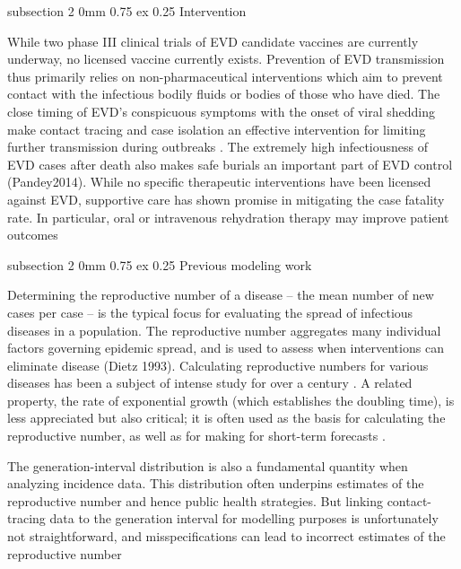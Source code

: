 \documentclass[12pt]{article}
\makeatletter
\renewcommand{\subsection}%
{\vspace{0.0ex \@plus 3.0ex \@minus 1.0ex}\@startsection  %
{subsection}%
{2}%
{0mm}%
{0.75\baselineskip \@plus 0.25 ex}%
{0.25\baselineskip}%
{\normalfont\large\bfseries}}%
\makeatother
\begin{document}
\subsection{Intervention}

While two phase III clinical trials of EVD candidate vaccines are currently underway, no licensed vaccine currently exists. Prevention of EVD transmission thus primarily relies on non-pharmaceutical interventions which aim to prevent contact with the infectious bodily fluids or bodies of those who have died. The close timing of EVD’s conspicuous symptoms with the onset of viral shedding make contact tracing and case isolation an effective intervention for limiting further transmission during outbreaks \cite{YamiGert15}. The extremely high infectiousness of EVD cases after death also makes safe burials an important part of EVD control (Pandey2014). While no specific therapeutic interventions have been licensed against EVD, supportive care has shown promise in mitigating the case fatality rate. In particular, oral or intravenous rehydration therapy may improve patient outcomes \cite{Bah2014}

\subsection{Previous modeling work}

Determining the reproductive number of a disease -- the mean number of new cases per case -- is the typical focus for evaluating the spread of infectious diseases in a population.  The reproductive number aggregates many individual factors governing epidemic spread, and is used to assess when interventions can eliminate disease (Dietz 1993). Calculating reproductive numbers for various diseases has been a subject of intense study for  over a century \cite{Ross11, KermMcKe27}.  A related property, the rate of exponential growth (which establishes the doubling time), is less appreciated but also critical;  it is often used as the basis for calculating the reproductive number, as well as for making for short-term forecasts \cite{Meltzer2014}.

The generation-interval distribution is also a fundamental quantity when analyzing incidence data. This distribution often underpins estimates of the reproductive number and hence public health strategies. But linking contact-tracing data to the generation interval for modelling purposes is unfortunately not straightforward, and misspecifications can lead to incorrect estimates of the reproductive number \cite{Svensson2007is, Kenah2008il, Tomba2010ig, Nishiura2009ct}
\end{document}
